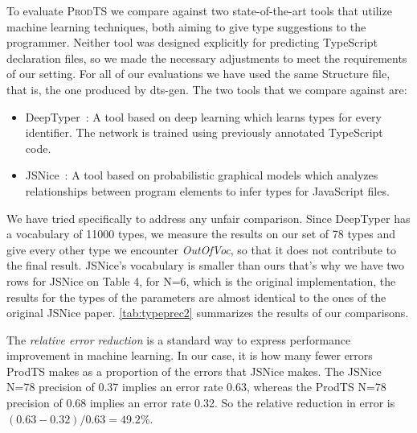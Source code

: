 \documentclass[sigplan,10pt,review,anonymous]{acmart} %
\newcommand{\prodts}{\textsc{ProdTS}\xspace}
\theoremstyle{plain}
\theoremstyle{remark}
\theoremstyle{definition}
\begin{document}
To evaluate \prodts we compare against two state-of-the-art tools that utilize machine learning techniques,
both aiming to give type suggestions to the programmer.
Neither tool was designed explicitly for predicting TypeScript declaration files,
so we made the necessary adjustments to meet the requirements of our setting.
For all of our evaluations we have used the same Structure file, that is, the one produced by dts-gen.
The two tools that we compare against are:
\begin{itemize}[label={\tiny$\bullet$}]
  \item DeepTyper~\cite{hellendoorn18}: A tool based on deep learning which learns types for every identifier.
        The network is trained using previously annotated TypeScript code.
  \item JSNice~\cite{raychev15}: A tool based on probabilistic graphical models which analyzes relationships
        between program elements to infer types for JavaScript files.
\end{itemize}

We have tried specifically to address any unfair comparison.
Since DeepTyper has a vocabulary of 11000 types, we measure the results on our set of 78 types
and give every other type we encounter \textit{OutOfVoc}, so that it does not contribute to the final result.
JSNice's vocabulary is smaller than ours that's why we have two rows for JSNice on Table 4, for N=6,
which is the original implementation,
the results for the types of the parameters are almost identical to the ones of the original JSNice paper.
\cref{tab:typeprec2} summarizes the results of our comparisons.

The \emph{relative error reduction} is a standard way to express performance improvement in machine learning.
In our case, it is how many fewer errors ProdTS makes as a proportion of the errors that JSNice makes.
The JSNice N=78 precision of 0.37 implies an error rate 0.63,
whereas the ProdTS N=78 precision of 0.68 implies an error rate 0.32.
So the relative reduction in error is $(0.63-0.32) / 0.63 = 49.2\%$.
\end{document}
